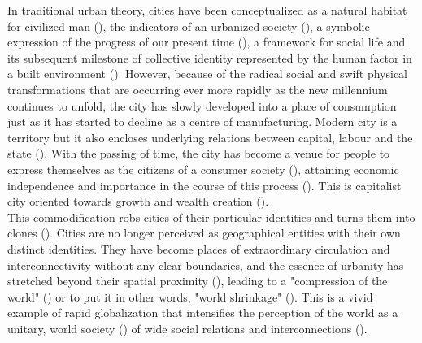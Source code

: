 \documentclass[11pt]{report}
\begin{document}
In traditional urban theory, cities have been conceptualized as a natural habitat for civilized man (\href{Park}{\citealt{park_human_1952}}), the indicators 
of an urbanized society (\href{Mumford}{\citealt{mumford_city_1961}}), a symbolic expression of the progress of our present time (\href{Osborne}{\citealt{osborne_modernity_1992}}), a 
framework for social life and its subsequent milestone of collective identity represented by the human factor in a built environment (\href{Berman}{\citealt{berman_all_1988}}).
However, because of the radical social and swift physical transformations that are occurring ever more rapidly as the new millennium continues to unfold, the city has slowly developed into a place of consumption just as it has started to decline as a centre of manufacturing.
Modern city is a territory but it also encloses underlying relations between capital, labour and the state (\href{Castells}{\citealt{castells_city_1983}}).
With the passing of time, the city has become a venue for people to express themselves as the citizens of a consumer society (\href{Slater}{\citealt{slater_consumer_2003}}), attaining economic independence and importance in the course of this process (\href{Miles}{\citealt{miles_spaces_2010}}).
This is capitalist city oriented towards growth and wealth creation (\href{Harvey}{\citealt{harvey_urban_1978}}).
\\   

This commodification robs cities of their particular identities and turns them into clones (\href{Miles}{\citealt{miles_spaces_2010}}).
Cities are no longer perceived as geographical entities with their own distinct identities.
They have become places of extraordinary circulation and 
interconnectivity without any clear boundaries, and the essence of urbanity has stretched beyond their spatial proximity (\href{Amin}{\citealt{amin_globalization_1996}}),  leading  to  a  "compression  of  the  world"  (\href{Robertson}{\citealt{robertson_globalization:_1992}}) or  to  put  it  in  other  words,  "world  shrinkage"
(\href{Larsson}{\citealt{larsson_race_2001}}).
This is a vivid example of rapid globalization that intensifies the perception of the world as a unitary, world society (\href{Albrow}{\citealt{albrow_globalization_1990}}) of wide social relations and interconnections (\href{Giddens}{\citealt{giddens_consequences_1992}}). 
\\
\end{document}
